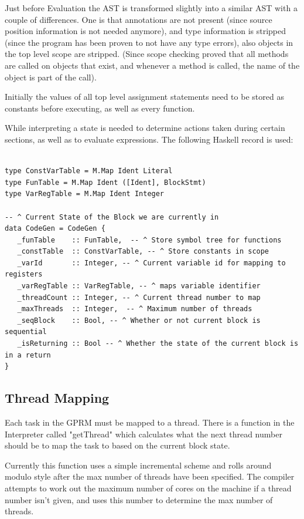 Just before Evaluation the AST is transformed slightly into a similar AST
with a couple of differences. One is that annotations are not present (since source position information
is not needed anymore), and type information is stripped (since the program has been proven to 
not have any type errors), also objects in the top level scope are stripped. (Since scope checking
proved that all methods are called on objects that exist, and whenever a method is called, the
name of the object is part of the call).

Initially the values of all top level assignment statements need to be stored
as constants before executing, as well as every function.

While interpreting a state is needed to determine actions taken
during certain sections, as well as to evaluate expressions.
The following Haskell record is used:

\begin{lstlisting}[style=myHaskell]

type ConstVarTable = M.Map Ident Literal
type FunTable = M.Map Ident ([Ident], BlockStmt)
type VarRegTable = M.Map Ident Integer

-- ^ Current State of the Block we are currently in
data CodeGen = CodeGen {
   _funTable    :: FunTable,  -- ^ Store symbol tree for functions
   _constTable  :: ConstVarTable, -- ^ Store constants in scope
   _varId       :: Integer, -- ^ Current variable id for mapping to registers
   _varRegTable :: VarRegTable, -- ^ maps variable identifier
   _threadCount :: Integer, -- ^ Current thread number to map
   _maxThreads  :: Integer,  -- ^ Maximum number of threads
   _seqBlock    :: Bool, -- ^ Whether or not current block is sequential
   _isReturning :: Bool -- ^ Whether the state of the current block is in a return
}

\end{lstlisting}


\subsection{Thread Mapping}
Each task in the GPRM must be mapped to a thread. There is a function
in the Interpreter called "getThread" which calculates what the next thread 
number should be to map the task to based on the current block state.

Currently this function uses a simple incremental scheme and rolls around
modulo style after the max number of threads have been specified. The compiler
attempts to work out the maximum number of cores on the machine if a thread
number isn't given, and uses this number to determine the max number of threads.

